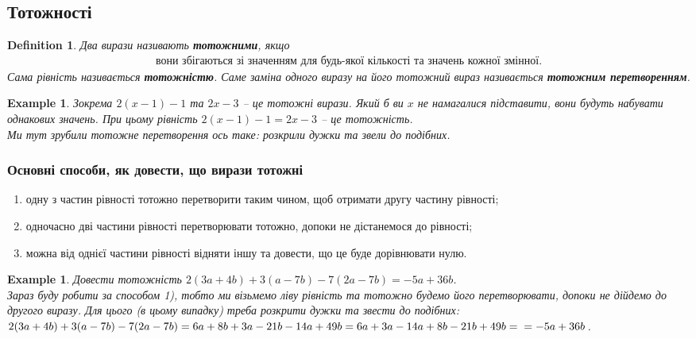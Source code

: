\documentclass[a4paper, 10pt]{article}
\theoremstyle{theoremdd}
\theoremstyle{theoremdd}
\newtheorem{definition}[theorem]{Definition}
\theoremstyle{theoremdd}
\theoremstyle{theoremdd}
\newtheorem{example}[theorem]{Example}
\theoremstyle{theoremdd}
\theoremstyle{theoremdd}
\theoremstyle{theoremdd}
\theoremstyle{theoremdd}
\begin{document}
\subsection{Тотожності}
\begin{definition}
Два вирази називають \textbf{тотожними}, якщо 
\begin{align*}
\text{вони збігаються зі значенням для будь-якої кількості та значень кожної змінної.}
\end{align*}
Сама рівність називається \textbf{тотожністю}. Саме заміна одного виразу на його тотожний вираз називається \textbf{тотожним перетворенням}.
\end{definition}

\begin{example}
Зокрема $2(x-1) - 1$ та $2x-3$ -- це тотожні вирази. Який б ви $x$ не намагалися підставити, вони будуть набувати однакових значень. При цьому рівність $2(x-1)-1=2x-3$ -- це тотожність. \\
Ми тут зрубили тотожне перетворення ось таке: розкрили дужки та звели до подібних.
\end{example}

\subsubsection*{Основні способи, як довести, що вирази тотожні}
\begin{enumerate}[nosep,wide=0pt,label={\arabic*)}]
\item одну з частин рівності тотожно перетворити таким чином, щоб отримати другу частину рівності;
\item одночасно дві частини рівності перетворювати тотожно, допоки не дістанемося до рівності;
\item можна від однієї частини рівності відняти іншу та довести, що це буде дорівнювати нулю.
\end{enumerate}

\begin{example}
Довести тотожність $2(3a + 4b) + 3(a-7b) - 7(2a - 7b) = -5a + 36b$.\\
Зараз буду робити за способом 1), тобто ми візьмемо ліву рівність та тотожно будемо його перетворювати, допоки не дійдемо до другого виразу. Для цього (в цьому випадку) треба розкрити дужки та звести до подібних:\\
$2(3a + 4b) + 3(a-7b) - 7(2a - 7b) = 6a + 8b + 3a - 21b - 14a + 49b = 6a + 3a - 14a + 8b - 21b +49b = \\ = -5a + 36b$.
\end{example}
\end{document}
